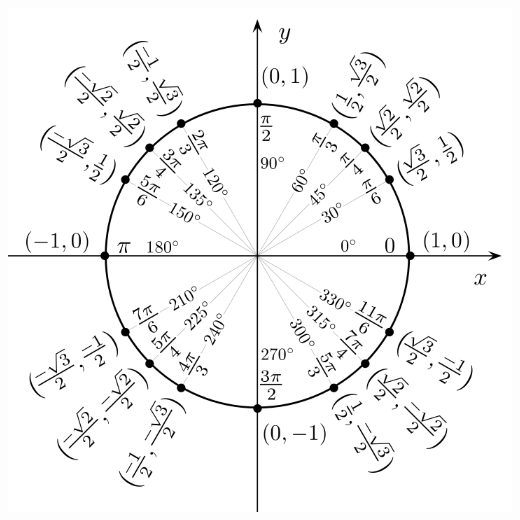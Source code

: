 \documentclass[10pt,landscape]{article}
\begin{document}
\begin{multicols}{3}
\includegraphics[width = \linewidth]{./img/unitCircle}






\end{multicols}
\end{document}
